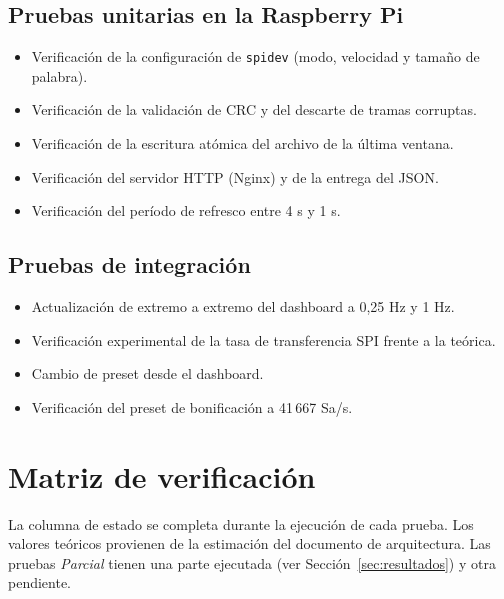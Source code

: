 \documentclass[12pt,a4paper]{article}
\begin{document}
\subsection{Pruebas unitarias en la Raspberry Pi}

\begin{itemize}
  \item Verificación de la configuración de \texttt{spidev} (modo, velocidad y tamaño de palabra).
  \item Verificación de la validación de CRC y del descarte de tramas corruptas.
  \item Verificación de la escritura atómica del archivo de la última ventana.
  \item Verificación del servidor HTTP (Nginx) y de la entrega del JSON.
  \item Verificación del período de refresco entre 4 s y 1 s.
\end{itemize}

\subsection{Pruebas de integración}

\begin{itemize}
  \item Actualización de extremo a extremo del dashboard a 0{,}25 Hz y 1 Hz.
  \item Verificación experimental de la tasa de transferencia SPI frente a la teórica.
  \item Cambio de preset desde el dashboard.
  \item Verificación del preset de bonificación a 41\,667 Sa/s.
\end{itemize}

\section{Matriz de verificación}

La columna de estado se completa durante la ejecución de cada prueba. Los valores teóricos provienen de la estimación del documento de arquitectura. Las pruebas \emph{Parcial} tienen una parte ejecutada (ver Sección~\ref{sec:resultados}) y otra pendiente.
\end{document}
